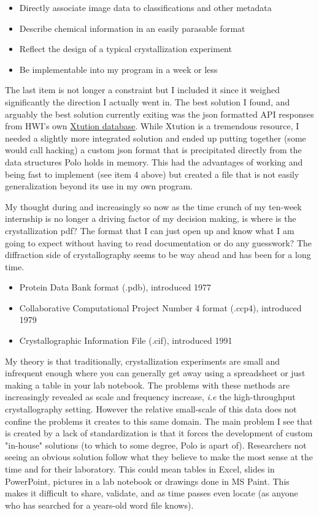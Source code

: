 \documentclass[]{article}
\begin{document}
\begin{itemize}
	\item Directly associate image data to classifications and other metadata
	\item Describe chemical information in an easily parasable format
	\item Reflect the design of a typical crystallization experiment
	\item Be implementable into my program in a week or less
\end{itemize}

The last item is not longer a constraint but I included it since it weighed significantly the direction I actually went in. The best solution I found, and arguably the best solution currently exiting was the json formatted API responses from HWI's own \href{http://xtuition.org/}{Xtution database}. While Xtution is a tremendous resource, I needed a slightly more integrated solution and ended up putting together (some would call hacking) a custom json format that is precipitated directly from the data structures Polo holds in memory. This had the advantages of working and being fast to implement (see item 4 above) but created a file that is not easily generalization beyond its use in my own program.

My thought during and increasingly so now as the time crunch of my ten-week internship is no longer a driving factor of my decision making, is where is the crystallization pdf? The format that I can just open up and know what I am going to expect without having to read documentation or do any guesswork? The diffraction side of crystallography seems to be way ahead and has been for a long time.

\begin{itemize}
	\item Protein Data Bank format (.pdb), introduced 1977 \cite{pmid875032}
	\item Collaborative Computational Project Number 4 format (.ccp4), introduced 1979
	\item Crystallographic Information File (.cif), introduced 1991 \cite{Hall:es0164}
\end{itemize}

My theory is that traditionally, crystallization experiments are small and infrequent enough where you can generally get away using a spreadsheet or just making a table in your lab notebook. The problems with these methods are increasingly revealed as scale and frequency increase, \textit{i.e} the high-throughput crystallography setting. However the relative small-scale of this data does not confine the problems it creates to this same domain. The main problem I see that is created by a lack of standardization is that it forces the development of custom "in-house" solutions (to which to some degree, Polo is apart of). Researchers not seeing an obvious solution follow what they believe to make the most sense at the time and for their laboratory. This could mean tables in Excel, slides in PowerPoint, pictures in a lab notebook or drawings done in MS Paint. This makes it difficult to share, validate, and as time passes even locate (as anyone who has searched for a years-old word file knows). 
\end{document}
